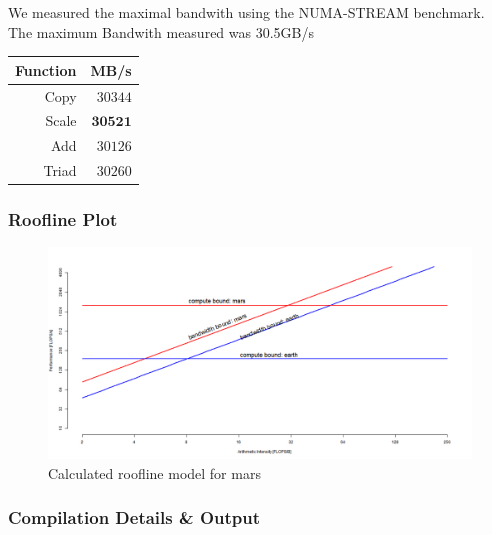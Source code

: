 We measured the maximal bandwith using the NUMA-STREAM benchmark.
The maximum Bandwith measured was 30.5GB/s

\begin{center}
\begin{tabular}{|r|r|}
	\hline
	Function & MB/s    \\ \hline
	Copy     & $30344$ \\ \hline
	Scale    & $\pmb{30521}$ \\ \hline
	Add      & $30126$ \\ \hline
	Triad    & $30260$ \\ \hline
\end{tabular}
\end{center}

\subsubsection{Roofline Plot}

\begin{figure}[]
	\centering
	\includegraphics[width=.5\linewidth]{figures/placeholder}
	\caption{Calculated roofline model for mars}
	\label{fig:runtime}
\end{figure}

\newpage
\subsubsection{Compilation Details \& Output}

